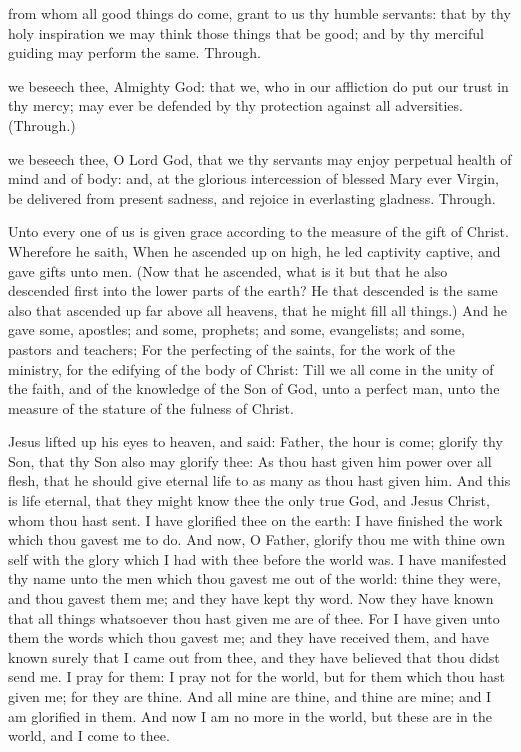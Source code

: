 \collect
{} from whom all good things do come, grant to us thy humble servants: that by thy holy inspiration we may think those things that be good; and by thy merciful guiding may perform the same. Through.

 we beseech thee, Almighty God: that we, who in our affliction do put our trust in thy mercy; may ever be defended by thy protection against all adversities. (Through.)

 we beseech thee, O Lord God, that we thy servants may enjoy perpetual health of mind and of body: and, at the glorious intercession of blessed Mary ever Virgin, be delivered from present sadness, and rejoice in everlasting gladness. Through.

 Unto every one of us is given grace according to the measure of the gift of Christ. Wherefore he saith, When he ascended up on high, he led captivity captive, and gave gifts unto men. (Now that he ascended, what is it but that he also descended first into the lower parts of the earth? He that descended is the same also that ascended up far above all heavens, that he might fill all things.) And he gave some, apostles; and some, prophets; and some, evangelists; and some, pastors and teachers; For the perfecting of the saints, for the work of the ministry, for the edifying of the body of Christ: Till we all come in the unity of the faith, and of the knowledge of the Son of God, unto a perfect man, unto the measure of the stature of the fulness of Christ.


 Jesus lifted up his eyes to heaven, and said: Father, the hour is come; glorify thy Son, that thy Son also may glorify thee: As thou hast given him power over all flesh, that he should give eternal life to as many as thou hast given him. And this is life eternal, that they might know thee the only true God, and Jesus Christ, whom thou hast sent. I have glorified thee on the earth: I have finished the work which thou gavest me to do. And now, O Father, glorify thou me with thine own self with the glory which I had with thee before the world was. I have manifested thy name unto the men which thou gavest me out of the world: thine they were, and thou gavest them me; and they have kept thy word. Now they have known that all things whatsoever thou hast given me are of thee. For I have given unto them the words which thou gavest me; and they have received them, and have known surely that I came out from thee, and they have believed that thou didst send me. I pray for them: I pray not for the world, but for them which thou hast given me; for they are thine. And all mine are thine, and thine are mine; and I am glorified in them. And now I am no more in the world, but these are in the world, and I come to thee.

